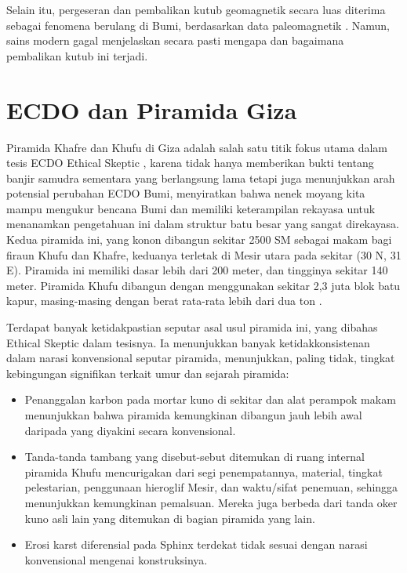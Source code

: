 \documentclass[10pt,twocolumn,letterpaper]{article}
\begin{document}
Selain itu, pergeseran dan pembalikan kutub geomagnetik secara luas diterima sebagai fenomena berulang di Bumi, berdasarkan data paleomagnetik \cite{35,40,41}. Namun, sains modern gagal menjelaskan secara pasti mengapa dan bagaimana pembalikan kutub ini terjadi.

\section{ECDO dan Piramida Giza}

Piramida Khafre dan Khufu di Giza adalah salah satu titik fokus utama dalam tesis ECDO Ethical Skeptic \cite{27}, karena tidak hanya memberikan bukti tentang banjir samudra sementara yang berlangsung lama tetapi juga menunjukkan arah potensial perubahan ECDO Bumi, menyiratkan bahwa nenek moyang kita mampu mengukur bencana Bumi dan memiliki keterampilan rekayasa untuk menanamkan pengetahuan ini dalam struktur batu besar yang sangat direkayasa. Kedua piramida ini, yang konon dibangun sekitar 2500 SM sebagai makam bagi firaun Khufu dan Khafre, keduanya terletak di Mesir utara pada sekitar (30 N, 31 E). Piramida ini memiliki dasar lebih dari 200 meter, dan tingginya sekitar 140 meter. Piramida Khufu dibangun dengan menggunakan sekitar 2,3 juta blok batu kapur, masing-masing dengan berat rata-rata lebih dari dua ton \cite{24, 25}.

Terdapat banyak ketidakpastian seputar asal usul piramida ini, yang dibahas Ethical Skeptic dalam tesisnya. Ia menunjukkan banyak ketidakkonsistenan dalam narasi konvensional seputar piramida, menunjukkan, paling tidak, tingkat kebingungan signifikan terkait umur dan sejarah piramida:

\begin{flushleft}
\begin{itemize}
    \item Penanggalan karbon pada mortar kuno di sekitar dan alat perampok makam menunjukkan bahwa piramida kemungkinan dibangun jauh lebih awal daripada yang diyakini secara konvensional.
    \item Tanda-tanda tambang yang disebut-sebut ditemukan di ruang internal piramida Khufu mencurigakan dari segi penempatannya, material, tingkat pelestarian, penggunaan hieroglif Mesir, dan waktu/sifat penemuan, sehingga menunjukkan kemungkinan pemalsuan. Mereka juga berbeda dari tanda oker kuno asli lain yang ditemukan di bagian piramida yang lain.
    \item Erosi karst diferensial pada Sphinx terdekat tidak sesuai dengan narasi konvensional mengenai konstruksinya.
\end{itemize}
\end{flushleft}
\end{document}
